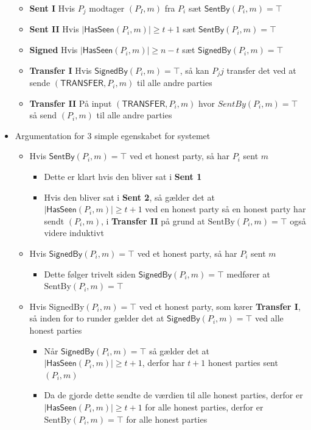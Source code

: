 \documentclass[a4, english]{article}
\begin{document}
\begin{itemize}
\begin{itemize}
    \item \textbf{Sent I} Hvis $P_j$ modtager $(P_I,m)$ fra $P_i$ sæt $\mathsf{SentBy}(P_i,m) = \top$
    \item \textbf{Sent II} Hvis $|\mathsf{HasSeen}(P_i,m)| \geq t+1$ sæt $\mathsf{SentBy}(P_i,m) = \top$
    \item \textbf{Signed} Hvis  $|\mathsf{HasSeen}(P_i,m)| \geq n-t$ sæt $\mathsf{SignedBy}(P_i,m) = \top$ 
    \item \textbf{Transfer I} Hvis $\mathsf{SignedBy}(P_i,m) = \top$, så kan $P_jj$ transfer det ved at sende $(\mathsf{TRANSFER}, P_i,m)$ til alle andre parties
    \item \textbf{Transfer II} På input $(\mathsf{TRANSFER}, P_i,m)$ hvor $SentBy(P_i,m)=\top$ så send $(P_i,m)$ til alle andre parties
  \end{itemize}
  \item Argumentation for 3 simple egenskabet for systemet  
  \begin{itemize}
  	\item Hvis $\mathsf{SentBy}(P_i,m) = \top$ ved et honest party, så har $P_i$ sent $m$ 
    \begin{itemize}
    	\item Dette er klart hvis den bliver sat i \textbf{Sent 1}
      \item Hvis den bliver sat i \textbf{Sent 2}, så gælder det at $|\mathsf{HasSeen}(P_i,m)| \geq t+1$ ved en honest party så en honest party har sendt $(P_i,m)$, i \textbf{Transfer II} på grund at $\text{SentBy}(P_i,m)=\top$ også videre induktivt
    \end{itemize} 
    \item Hvis $\mathsf{SignedBy}(P_i,m) = \top$ ved et honest party, så har $P_i$ sent $m$ 
    \begin{itemize}
  	  \item Dette følger trivelt siden $\mathsf{SignedBy}(P_i,m) = \top$ medfører at $\text{SentBy}(P_i,m)=\top$
    \end{itemize}
    \item Hvis $\text{SignedBy}(P_i,m) = \top$ ved et honest party, som kører \textbf{Transfer I}, så inden for to runder gælder det at $\mathsf{SignedBy}(P_i,m) = \top$ ved alle honest parties
    \begin{itemize}
    	\item Når $\mathsf{SignedBy}(P_i,m) = \top$ så gælder det at $|\mathsf{HasSeen}(P_i,m)| \geq t+1$, derfor har $t+1$ honest parties sent $(P_i,m)$
      \item Da de gjorde dette sendte de værdien til alle honest parties, derfor er  $|\mathsf{HasSeen}(P_i,m)| \geq t+1$ for alle honest parties, derfor er $\text{SentBy}(P_i,m) = \top$ for alle honest parties

\end{itemize}
\end{itemize}
\end{itemize}
\end{document}
